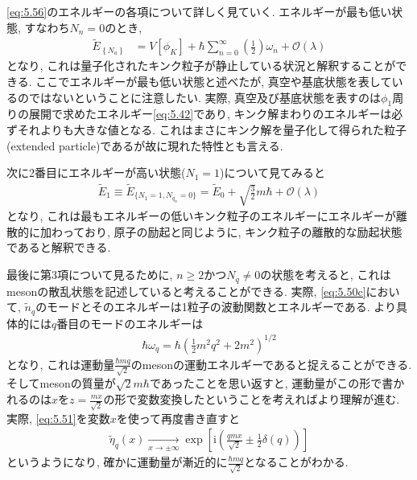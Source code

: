 \documentclass[dvipdfmx,11pt,a4paper,oneside,openany]{jsbook}
\begin{document}
\eqref{eq:5.56}のエネルギーの各項について詳しく見ていく. エネルギーが最も低い状態, すなわち$N_n=0$のとき,
\begin{align*}
    \tilde{E}_{\left\{N_{a}\right\}} & =V\left[\phi_{K}\right]+\hbar \sum_{n=0}^{\infty}\left(\frac{1}{2}\right) \omega_{n}+\mathcal{O}(\lambda)
\end{align*}
となり, これは量子化されたキンク粒子が静止している状況と解釈することができる. ここでエネルギーが最も低い状態と述べたが, 真空や基底状態を表しているのではないということに注意したい. 実際, 真空及び基底状態を表すのは$\phi_1$周りの展開で求めたエネルギー\eqref{eq:5.42}であり, キンク解まわりのエネルギーは必ずそれよりも大きな値となる. これはまさにキンク解を量子化して得られた粒子(extended particle)であるが故に現れた特性とも言える.

次に2番目にエネルギーが高い状態($N_1=1$)について見てみると
\begin{align*}
    \tilde{E}_1\equiv\tilde{E}_{\{N_1=1, N_{q_n}=0\}}=\tilde{E}_0+\sqrt{\frac{3}{2}}m\hbar+\mathcal{O}(\lambda)
\end{align*}
となり, これは最もエネルギーの低いキンク粒子のエネルギーにエネルギーが離散的に加わっており, 原子の励起と同じように, キンク粒子の離散的な励起状態であると解釈できる.

最後に第3項について見るために, $n\geq2$かつ$N_q\neq0$の状態を考えると, これはmesonの散乱状態を記述していると考えることができる. 実際, \eqref{eq:5.50c}において, $\tilde{n}_q$のモードとそのエネルギーは1粒子の波動関数とエネルギーである. より具体的には$q$番目のモードのエネルギーは
\begin{align*}
    \hbar \omega_{q}=\hbar\left(\frac{1}{2} m^{2} q^{2}+2 m^{2}\right)^{1 / 2}
\end{align*}
となり, これは運動量$\frac{\hbar mq}{\sqrt{2}}$のmesonの運動エネルギーであると捉えることができる.そしてmesonの質量が$\sqrt{2}m\hbar$であったことを思い返すと, 運動量がこの形で書かれるのは$x$を$z=\frac{mx}{\sqrt{2}}$の形で変数変換したということを考えればより理解が進む. 実際, \eqref{eq:5.51}を変数$x$を使って再度書き直すと
\begin{align*}
    \tilde{\eta}_{q}(x) \underset{x \rightarrow \pm \infty}{\longrightarrow} \exp \left[\mathrm{i}\left(\frac{qmx}{\sqrt{2}} \pm \frac{1}{2} \delta(q)\right)\right]
\end{align*}
というようになり, 確かに運動量が漸近的に$\frac{\hbar mq}{\sqrt{2}}$となることがわかる.
\end{document}
